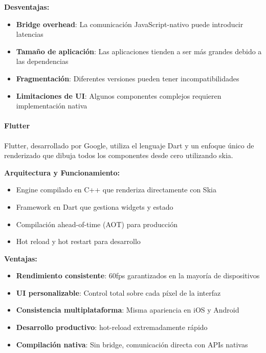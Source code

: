 \textbf{Desventajas:}
\begin{itemize}
    \item \textbf{Bridge overhead}: La comunicación JavaScript-nativo puede introducir latencias
    \item \textbf{Tamaño de aplicación}: Las aplicaciones tienden a ser más grandes debido a las dependencias
    \item \textbf{Fragmentación}: Diferentes versiones pueden tener incompatibilidades
    \item \textbf{Limitaciones de UI}: Algunos componentes complejos requieren implementación nativa
\end{itemize}

\paragraph{Flutter}

Flutter, desarrollado por Google, utiliza el lenguaje Dart y un enfoque único de renderizado que dibuja todos los componentes desde cero utilizando \gls{skia}.

\textbf{Arquitectura y Funcionamiento:}
\begin{itemize}
    \item Engine compilado en C++ que renderiza directamente con Skia
    \item Framework en Dart que gestiona widgets y estado
    \item Compilación \gls{ahead-of-time} (AOT) para producción
    \item Hot reload y hot restart para desarrollo
\end{itemize}

\textbf{Ventajas:}
\begin{itemize}
    \item \textbf{Rendimiento consistente}: 60\acrshort{fps} garantizados en la mayoría de dispositivos
    \item \textbf{UI personalizable}: Control total sobre cada píxel de la interfaz
    \item \textbf{Consistencia multiplataforma}: Misma apariencia en iOS y Android
    \item \textbf{Desarrollo productivo}: \Gls{hot-reload} extremadamente rápido
    \item \textbf{Compilación nativa}: Sin bridge, comunicación directa con APIs nativas
\end{itemize}

